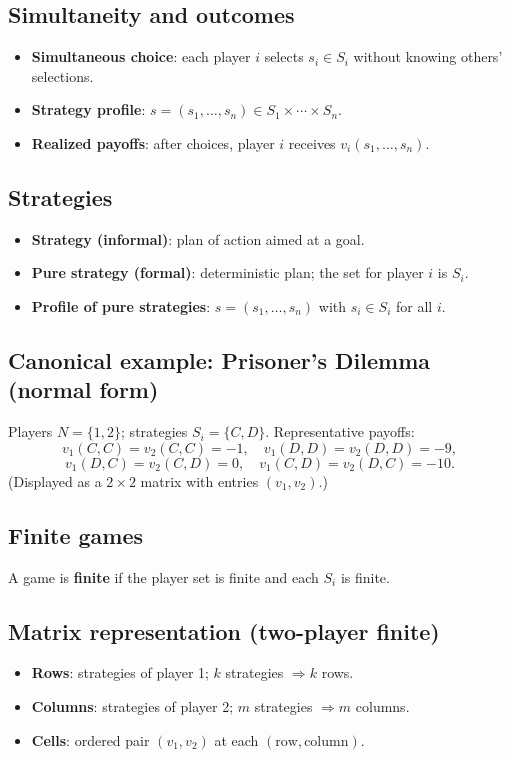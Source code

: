 \documentclass[10pt]{article}
\begin{document}
\subsection*{Simultaneity and outcomes}
\begin{itemize}
  \item \textbf{Simultaneous choice}: each player $i$ selects $s_i\in S_i$ without knowing others’ selections.
  \item \textbf{Strategy profile}: $s=(s_1,\dots,s_n)\in S_1\times\cdots\times S_n$.
  \item \textbf{Realized payoffs}: after choices, player $i$ receives $v_i(s_1,\dots,s_n)$.
\end{itemize}

\subsection*{Strategies}
\begin{itemize}
  \item \textbf{Strategy (informal)}: plan of action aimed at a goal.
  \item \textbf{Pure strategy (formal)}: deterministic plan; the set for player $i$ is $S_i$.
  \item \textbf{Profile of pure strategies}: $s=(s_1,\dots,s_n)$ with $s_i\in S_i$ for all $i$.
\end{itemize}

\subsection*{Canonical example: Prisoner’s Dilemma (normal form)}
Players $N=\{1,2\}$; strategies $S_i=\{C,D\}$.
Representative payoffs:
\[
v_1(C,C)=v_2(C,C)=-1,\quad
v_1(D,D)=v_2(D,D)=-9,
\]
\[
v_1(D,C)=v_2(C,D)=0,\quad
v_1(C,D)=v_2(D,C)=-10.
\]
(Displayed as a $2\times2$ matrix with entries $(v_1,v_2)$.)

\subsection*{Finite games}
A game is \textbf{finite} if the player set is finite and each $S_i$ is finite.

\subsection*{Matrix representation (two-player finite)}
\begin{itemize}
  \item \textbf{Rows}: strategies of player 1; $k$ strategies $\Rightarrow k$ rows.
  \item \textbf{Columns}: strategies of player 2; $m$ strategies $\Rightarrow m$ columns.
  \item \textbf{Cells}: ordered pair $(v_1,v_2)$ at each $(\text{row},\text{column})$.
\end{itemize}
\end{document}
